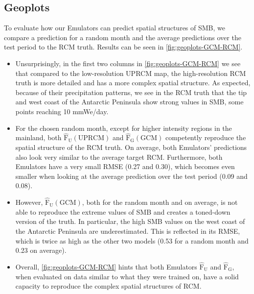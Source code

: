 \documentclass[a4paper,11pt,oneside]{report}
\begin{document}
\subsection{Geoplots}
To evaluate how our Emulators can predict spatial structures of SMB, we compare a prediction for a random month and the average predictions over the test period to the RCM truth. Results can be seen in \autoref{fig:geoplots-GCM-RCM}. 
\begin{itemize}
    \item Unsurprisingly, in the first two columns in \autoref{fig:geoplots-GCM-RCM} we see that compared to the low-resolution UPRCM map, the high-resolution RCM truth is more detailed and has a more complex spatial structure. As expected, because of their precipitation patterns, we see in the RCM truth that the tip and west coast of the Antarctic Peninsula show strong values in SMB, some points reaching 10 \si{mmWe/day}. 
    \item For the chosen random month, except for higher intensity regions in the mainland, both $\mathrm{\hat{F}_{U}(UPRCM)}$ and $\mathrm{\hat{F}_{G}(GCM)}$ competently reproduce the spatial structure of the RCM truth. On average, both Emulators' predictions also look very similar to the average target RCM. Furthermore, both Emulators have a very small RMSE (0.27 and 0.30), which becomes even smaller when looking at the average prediction over the test period (0.09 and 0.08). 
    \item However, $\mathrm{\hat{F}_{U}(GCM)}$, both for the random month and on average, is not able to reproduce the extreme values of SMB and creates a toned-down version of the truth. In particular, the high SMB values on the west coast of the Antarctic Peninsula are underestimated. This is reflected in its RMSE, which is twice as high as the other two models (0.53 for a random month and 0.23 on average). 
    \item Overall, \autoref{fig:geoplots-GCM-RCM} hints that both Emulators $\mathrm{\hat{F}_{U}}$ and $\mathrm{\hat{F}_{G}}$, when evaluated on data similar to what they were trained on, have a solid capacity to reproduce the complex spatial structures of RCM. 
\end{itemize}
\end{document}
